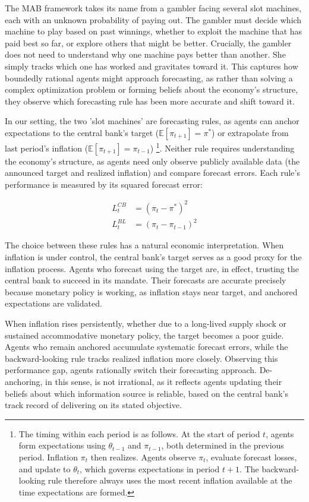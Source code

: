 \documentclass[10pt]{article}
\begin{document}
The MAB framework takes its name from a gambler facing several slot machines, each with an unknown probability of paying out. The gambler must decide which machine to play based on past winnings, whether to exploit the machine that has paid best so far, or explore others that might be better. Crucially, the gambler does not need to understand why one machine pays better than another. She simply tracks which one has worked and gravitates toward it. This captures how boundedly rational agents might approach forecasting, as rather than solving a complex optimization problem or forming beliefs about the economy's structure, they observe which forecasting rule has been more accurate and shift toward it.

In our setting, the two 'slot machines' are forecasting rules, as agents can anchor expectations to the central bank's target ($\mathbb{E}[\pi_{t+1}] = \pi^*$) or extrapolate from last period's inflation ($\mathbb{E}[\pi_{t+1}] = \pi_{t-1}$) \footnote{The timing within each period is as follows. At the start of period $t$, agents form expectations using $\theta_{t-1}$ and $\pi_{t-1}$, both determined in the previous period. Inflation $\pi_t$ then realizes. Agents observe $\pi_t$, evaluate forecast losses, and update to $\theta_t$, which governs expectations in period $t+1$. The backward-looking rule therefore always uses the most recent inflation available at the time expectations are formed.}. Neither rule requires understanding the economy's structure, as agents need only observe publicly available data (the announced target and realized inflation) and compare forecast errors. Each rule's performance is measured by its squared forecast error:

\begin{align}
L^{CB}_t &= (\pi_t - \pi^*)^2\\
L^{BL}_t &= (\pi_t - \pi_{t-1})^2
\end{align}
  
The choice between these rules has a natural economic interpretation. When inflation is under control, the central bank's target serves as a good proxy for the inflation process. Agents who forecast using the target are, in effect, trusting the central bank to succeed in its mandate. Their forecasts are accurate precisely because monetary policy is working, as inflation stays near target, and anchored expectations are validated.

When inflation rises persistently, whether due to a long-lived supply shock or sustained accommodative monetary policy, the target becomes a poor guide. Agents who remain anchored accumulate systematic forecast errors, while the backward-looking rule tracks realized inflation more closely. Observing this performance gap, agents rationally switch their forecasting approach. De-anchoring, in this sense, is not irrational, as it reflects agents updating their beliefs about which information source is reliable, based on the central bank's track record of delivering on its stated objective.
\end{document}
